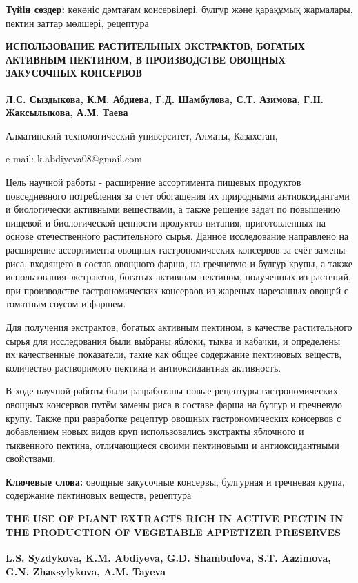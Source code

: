{\bfseries Түйін сөздер:} көкөніс дәмтағам консервілері, булгур және
қарақұмық жармалары, пектин заттар мөлшері, рецептура

\begin{articleheader}
{\bfseries ИСПОЛЬЗОВАНИЕ РАСТИТЕЛЬНЫХ ЭКСТРАКТОВ, БОГАТЫХ АКТИВНЫМ ПЕКТИНОМ, В ПРОИЗВОДСТВЕ ОВОЩНЫХ ЗАКУСОЧНЫХ КОНСЕРВОВ}

{\bfseries
Л.С. Сыздыкова,
К.М. Абдиева\textsuperscript{\envelope },
Г.Д. Шамбулова,
С.Т. Азимова,
Г.Н. Жаксылыкова,
А.М. Таева
}
\end{articleheader}

\begin{affiliation}
Алматинский технологический университет, Алматы, Казахстан,

e-mail: k.abdiyeva08@gmail.com
\end{affiliation}

Цель научной работы - расширение ассортимента пищевых продуктов
повседневного потребления за счёт обогащения их природными
антиоксидантами и биологически активными веществами, а также решение
задач по повышению пищевой и биологической ценности продуктов питания,
приготовленных на основе отечественного растительного сырья. Данное
исследование направлено на расширение ассортимента овощных
гастрономических консервов за счёт замены риса, входящего в состав
овощного фарша, на гречневую и булгур крупы, а также использования
экстрактов, богатых активным пектином, полученных из растений, при
производстве гастрономических консервов из жареных нарезанных овощей с
томатным соусом и фаршем.

Для получения экстрактов, богатых активным пектином, в качестве
растительного сырья для исследования были выбраны яблоки, тыква и
кабачки, и определены их качественные показатели, такие как общее
содержание пектиновых веществ, количество растворимого пектина и
антиоксидантная активность.

В ходе научной работы были разработаны новые рецептуры гастрономических
овощных консервов путём замены риса в составе фарша на булгур и
гречневую крупу. Также при разработке рецептур овощных гастрономических
консервов с добавлением новых видов круп использовались экстракты
яблочного и тыквенного пектина, отличающиеся своими пектиновыми и
антиоксидантными свойствами.

{\bfseries Ключевые слова:} овощные закусочные консервы, булгурная и
гречневая крупа, содержание пектиновых веществ, рецептура

\begin{articleheader}
{\bfseries THE USE OF PLANT EXTRACTS RICH IN ACTIVE PECTIN IN THE PRODUCTION OF VEGETABLE APPETIZER PRESERVES}

{\bfseries
L.S. Syzdykova,
K.M. Abdiyeva\textsuperscript{\envelope },
G.D. Shаmbulоvа,
S.T. Aаzimova,
G.N. Zhакsylykova,
A.M. Tayeva
}
\end{articleheader}

